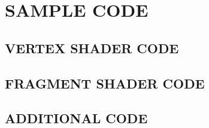 \chapter{SAMPLE CODE}

\section{VERTEX SHADER CODE}

\section{FRAGMENT SHADER CODE}

\section{ADDITIONAL CODE}





